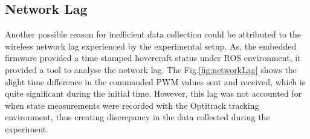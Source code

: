 \documentclass[12pt,titlepage]{article}
\begin{document}
\subsection*{Network Lag}
Another possible reason for inefficient data collection could be attributed to the wireless network lag experienced by the experimental setup. As, the embedded firmware provided a time stamped hovercraft status under ROS environment, it provided a tool to analyse the network lag. The Fig.\ref{fig:networkLag} shows the slight time difference in the commanded PWM values sent and received, which is quite significant during the initial time. However, this lag was not accounted for when state measurements were recorded with the Optitrack tracking environment, thus creating discrepancy in the data collected during the experiment. 

\begin{figure}[H]
	\centering
	

\end{figure}
\end{document}
